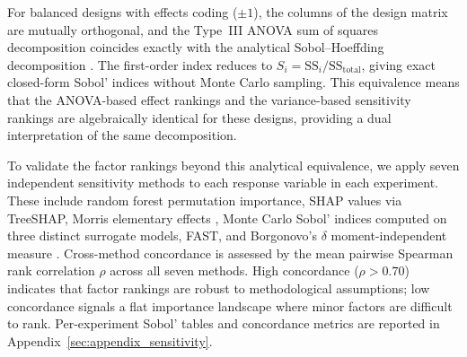 For balanced designs with effects coding ($\pm 1$), the columns of the design matrix are mutually orthogonal, and the Type~III ANOVA sum of squares decomposition coincides exactly with the analytical Sobol--Hoeffding decomposition \citep{Saltelli2008}. The first-order index reduces to $S_i = \mathrm{SS}_i / \mathrm{SS}_{\mathrm{total}}$, giving exact closed-form Sobol' indices without Monte Carlo sampling. This equivalence means that the ANOVA-based effect rankings and the variance-based sensitivity rankings are algebraically identical for these designs, providing a dual interpretation of the same decomposition.

To validate the factor rankings beyond this analytical equivalence, we apply seven independent sensitivity methods to each response variable in each experiment. These include random forest permutation importance, SHAP values via TreeSHAP, Morris elementary effects \citep{Morris1991}, Monte Carlo Sobol' indices computed on three distinct surrogate models, FAST, and Borgonovo's $\delta$ moment-independent measure \citep{Borgonovo2007}. Cross-method concordance is assessed by the mean pairwise Spearman rank correlation $\rho$ across all seven methods. High concordance ($\rho > 0.70$) indicates that factor rankings are robust to methodological assumptions; low concordance signals a flat importance landscape where minor factors are difficult to rank. Per-experiment Sobol' tables and concordance metrics are reported in Appendix~\ref{sec:appendix_sensitivity}.
